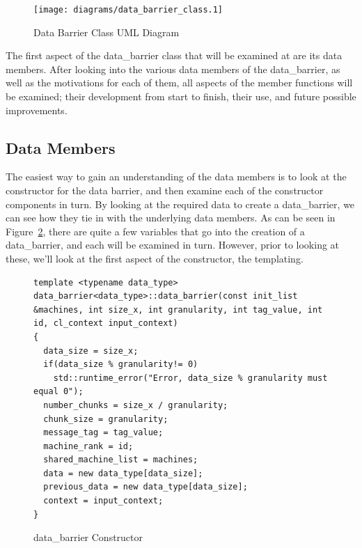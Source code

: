\documentclass[../thesis.tex]{subfiles}
\begin{document}
\begin{figure}[htbp]
  \centering
  \texttt{[image: diagrams/data\_barrier\_class.1]}
  \caption{Data Barrier Class UML Diagram}
  \label{fig:data_barrier_class}
\end{figure}

The first aspect of the data\_barrier class that will be examined at are its data members. After looking into the various data members of the data\_barrier, as well as the motivations for each of them, all aspects of the member functions will be examined; their development from start to finish, their use, and future possible improvements.

\subsection{Data Members} %
\label{sub:data_members}
  The easiest way to gain an understanding of the data members is to look at the constructor for the data barrier, and then examine each of the constructor components in turn. By looking at the required data to create a data\_barrier, we can see how they tie in with the underlying data members. As can be seen in Figure~\ref{fig:data_barrier_constructor}, there are quite a few variables that go into the creation of a data\_barrier, and each will be examined in turn. However, prior to looking at these, we'll look at the first aspect of the constructor, the templating.

  \begin{figure}[htbp]
    \centering

    \lstset{language=cpp}  
    \begin{lstlisting}[tabsize=2]
template <typename data_type> data_barrier<data_type>::data_barrier(const init_list &machines, int size_x, int granularity, int tag_value, int id, cl_context input_context)
{
  data_size = size_x;
  if(data_size % granularity!= 0)
    std::runtime_error("Error, data_size % granularity must equal 0");
  number_chunks = size_x / granularity;
  chunk_size = granularity;
  message_tag = tag_value;
  machine_rank = id;
  shared_machine_list = machines;
  data = new data_type[data_size];
  previous_data = new data_type[data_size];
  context = input_context;
}
      \end{lstlisting}

    \caption{data\_barrier Constructor}
    \label{fig:data_barrier_constructor}
  \end{figure}
   
\end{document}
